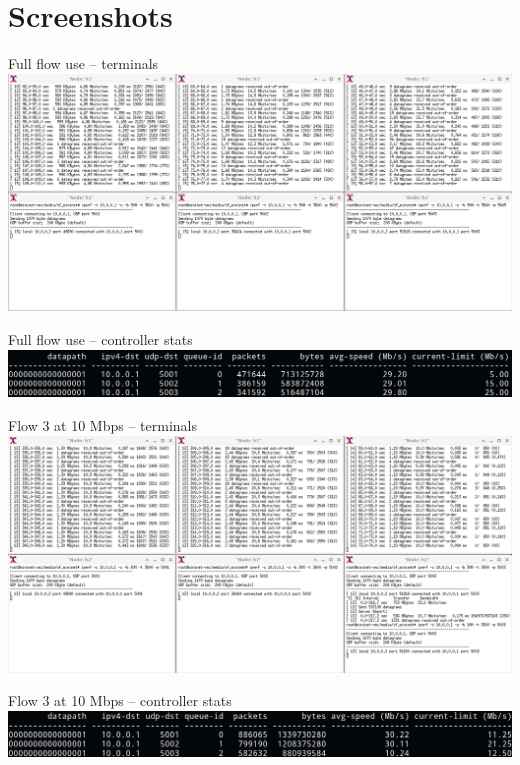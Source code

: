 \documentclass[12pt,aspectratio=169]{beamer}
\begin{document}
\section{Screenshots}
\begin{frame}{Full flow use -- terminals}
	\centering
	\includegraphics[width=\linewidth]{resources/screenshot-full-use-terminals.png}
\end{frame}
\begin{frame}{Full flow use -- controller stats}
	\centering
	\includegraphics[width=\linewidth]{resources/screenshot-full-use-controllerstats.png}
\end{frame}


\begin{frame}{Flow 3 at 10 Mbps -- terminals}
	\centering
	\includegraphics[width=\linewidth]{resources/screenshot-f3-10M-terminals.png}
\end{frame}
\begin{frame}{Flow 3 at 10 Mbps -- controller stats}
\centering
\includegraphics[width=\linewidth]{resources/screenshot-f3-10M-controllerstats.png}
\end{frame}
\end{document}
